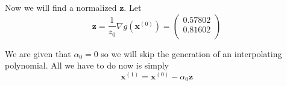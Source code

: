 \documentclass[12pt]{article}
\begin{document}
Now we will find a normalized $\mathbf{z}$. Let
\begin{equation*}
  \mathbf{z} = \frac{1}{z_0}\nabla g(\textbf{x}^{(0)}) = 
  \begin{pmatrix}
    0.57802 \\
    0.81602 \\
  \end{pmatrix}
\end{equation*}

% 
% 
% 
% 
% 

We are given that $\alpha_0=0$ so we will skip the generation of an
interpolating polynomial. All we have to do now is simply
\begin{equation}
  \label{eq:stp_x1}
  \mathbf{x}^{(1)}=\mathbf{x}^{(0)}-\alpha_0\mathbf{z}
\end{equation}
\end{document}
